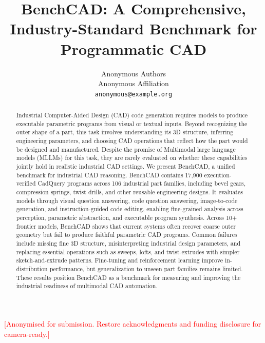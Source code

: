 \documentclass{article}
\title{BenchCAD: A Comprehensive, Industry-Standard Benchmark for Programmatic CAD}
\author{%
  Anonymous Authors \\
  Anonymous Affiliation \\
  \texttt{anonymous@example.org}
}
\newcommand{\lei}[1]{{\color{cyan} [{\bf LEI}: #1]}}
\begin{document}
\maketitle

\begin{abstract}
Industrial Computer-Aided Design (CAD) code generation requires models to produce executable parametric programs from visual or textual inputs. 
Beyond recognizing the outer shape of a part, this task involves understanding its 3D structure, inferring engineering parameters, and choosing CAD operations that reflect how the part would be designed and manufactured. Despite the promise of Multimodal large language models (MLLMs) for this task, they are rarely evaluated on whether these capabilities jointly hold in realistic industrial CAD settings. We present BenchCAD, a unified benchmark for industrial CAD reasoning. BenchCAD contains 17,900 execution-verified CadQuery programs across 106 industrial part families, including bevel gears, compression springs, twist drills, and other reusable engineering designs. It evaluates models through visual question answering, code question answering, image-to-code generation, and instruction-guided code editing, enabling fine-grained analysis across perception, parametric abstraction, and executable program synthesis. Across 10+ frontier models, BenchCAD shows that current systems often recover coarse outer geometry but fail to produce faithful parametric CAD programs. Common failures include missing fine 3D structure, misinterpreting industrial design parameters, and replacing essential operations such as sweeps, lofts, and twist-extrudes with simpler sketch-and-extrude patterns. Fine-tuning and reinforcement learning improve in-distribution performance, but generalization to unseen part families remains limited. These results position BenchCAD as a benchmark for measuring and improving the industrial readiness of multimodal CAD automation.
\end{abstract}








\begin{ack}
\textcolor{red}{[Anonymised for submission. Restore acknowledgments and funding disclosure for camera-ready.]}
\end{ack}






\newpage

\end{document}

